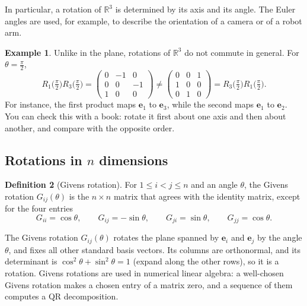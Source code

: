 \documentclass[11pt]{article}
\theoremstyle{definition}
\newtheorem{definition}{Definition}[section]
\newtheorem{example}[definition]{Example}
\theoremstyle{plain}
\theoremstyle{remark}
\begin{document}
In particular, a rotation of $\mathbb{R}^3$ is determined by its axis and its angle. The Euler angles are used, for example, to describe the orientation of a camera or of a robot arm.

\begin{example}
    Unlike in the plane, rotations of $\mathbb{R}^3$ do not commute in general. For $\theta = \frac{\pi}{2}$,
    \[R_1\big(\tfrac{\pi}{2}\big) R_3\big(\tfrac{\pi}{2}\big) = \begin{pmatrix} 0 & -1 & 0 \\ 0 & 0 & -1 \\ 1 & 0 & 0 \end{pmatrix} \neq \begin{pmatrix} 0 & 0 & 1 \\ 1 & 0 & 0 \\ 0 & 1 & 0 \end{pmatrix} = R_3\big(\tfrac{\pi}{2}\big) R_1\big(\tfrac{\pi}{2}\big).\]
    For instance, the first product maps $\mathbf{e}_1$ to $\mathbf{e}_3$, while the second maps $\mathbf{e}_1$ to $\mathbf{e}_2$. You can check this with a book: rotate it first about one axis and then about another, and compare with the opposite order.
\end{example}

\subsection{\texorpdfstring{Rotations in $n$ dimensions}{Rotations in n dimensions}}

\begin{definition}[Givens rotation]
    For $1 \leq i < j \leq n$ and an angle $\theta$, the Givens rotation $G_{ij}(\theta)$ is the $n \times n$ matrix that agrees with the identity matrix, except for the four entries
    \[G_{ii} = \cos\theta, \qquad G_{ij} = -\sin\theta, \qquad G_{ji} = \sin\theta, \qquad G_{jj} = \cos\theta.\]
\end{definition}

The Givens rotation $G_{ij}(\theta)$ rotates the plane spanned by $\mathbf{e}_i$ and $\mathbf{e}_j$ by the angle $\theta$, and fixes all other standard basis vectors. Its columns are orthonormal, and its determinant is $\cos^2\theta + \sin^2\theta = 1$ (expand along the other rows), so it is a rotation. Givens rotations are used in numerical linear algebra: a well-chosen Givens rotation makes a chosen entry of a matrix zero, and a sequence of them computes a QR decomposition.
\end{document}
